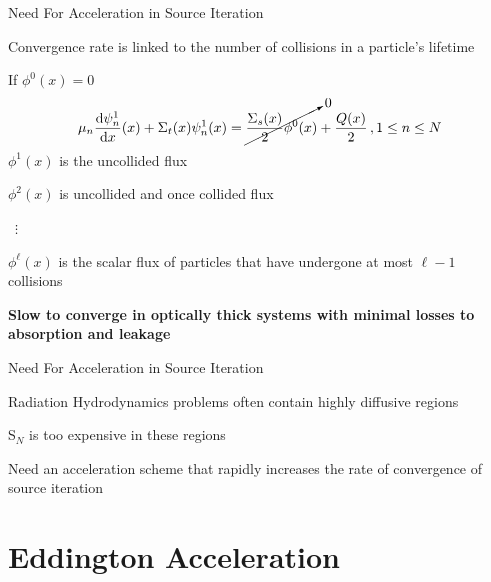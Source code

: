 \documentclass[10pt]{beamer}
\newcommand{\SN}{S$_N$\xspace}
\newcommand{\ud}{\mathop{}\!\mathrm{d}} %
\newcommand{\dderiv}[2]{\frac{\ud #1}{\ud #2}}
\begin{document}
\begin{frame}{Need For Acceleration in Source Iteration}

	Convergence rate is linked to the number of collisions in a particle's lifetime

	If $\phi^0(x) = 0$
	\begin{equation*}
		\mu_n \dderiv{\psi_n^{1}}{x}(x) + \Sigma_t(x) \psi_n^{1}(x) =
		\vphantom{\cancelto{0}{\frac{\Sigma_s(x)}{2} \phi^{0}(x)}} 
		\cancelto{0}{\frac{\Sigma_s(x)}{2} \phi^{0}(x)}
		 + \frac{Q(x)}{2} \,, 1 \leq n \leq N 
	\end{equation*}
	\onslide<3->
	$\phi^1(x) $ is the uncollided flux 

	$\phi^2(x)$ is uncollided and once collided flux 

	\ $\vdots$

	$\phi^{\ell}(x)$ is the scalar flux of particles that have undergone at most $\ell - 1$ collisions 

	\textbf{Slow to converge in optically thick systems with minimal losses to absorption and leakage}

\end{frame}

\begin{frame}{Need For Acceleration in Source Iteration}

	Radiation Hydrodynamics problems often contain highly diffusive regions 

	\SN is too expensive in these regions 

	Need an \alert{acceleration scheme} that rapidly increases the rate of convergence of source iteration 

\end{frame}

\section{Eddington Acceleration}
\end{document}
